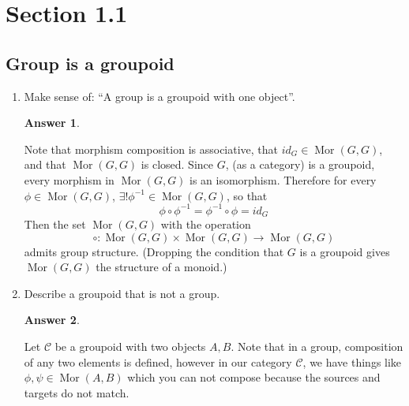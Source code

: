 \documentclass[hidelinks,12pt]{article}
\title{\scalebox{1.45}{Algebraic Geometry Problems}}
\author{\scalebox{1.5}{Theo Koss}}
\date{September 2026}
\newtheorem*{answer}{Answer}
\newcommand{\mor}{\operatorname{Mor}}
\begin{document}
\maketitle
\section{Section 1.1}
\subsection{Group is a groupoid}
\begin{enumerate}[label=(\alph*)]
    \item Make sense of: ``A group is a groupoid with one object''. \begin{answer}\end{answer}
        Note that morphism composition is associative, that \(id_{G}\in\mor(G,G)\), and that \(\mor(G,G)\) is closed.
        Since \(G\), (as a category) is a groupoid, every morphism in \(\mor(G,G)\) is an isomorphism. Therefore for every \(\phi\in\mor(G,G)\), \(\exists!\phi^{-1}\in\mor(G,G)\), so that \[ \phi\circ\phi^{-1}=\phi^{-1}\circ\phi=id_{G} \]
        Then the set \(\mor(G,G)\) with the operation
        \[
            \circ:\mor(G,G)\times\mor(G,G)\to\mor(G,G)
        \]
        admits group structure. (Dropping the condition that \(G\) is a groupoid gives \(\mor(G,G)\) the structure of a monoid.)
    \item Describe a groupoid that is not a group. \begin{answer} \end{answer}
        Let \(\mathcal{C}\) be a groupoid with two objects \(A,B\). Note that in a group, composition of any two elements is defined, however in our category \(\mathcal{C}\), we have things like \(\phi,\psi\in\mor(A,B)\) which you can not compose because the sources and targets do not match.
\end{enumerate} 
\end{document}
